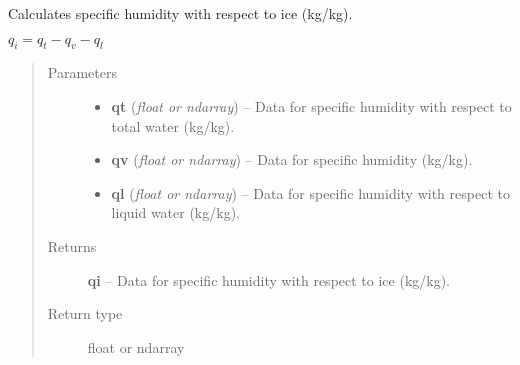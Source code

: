 \documentclass[letterpaper,10pt,english]{sphinxmanual}
\begin{document}
\begin{fulllineitems}
\label{atmos:atmos.equations.qi_from_qt_qv_ql}
Calculates specific humidity with respect to ice (kg/kg).

\(q_i = q_t-q_v-q_l\)
\begin{quote}\begin{description}
\item[{Parameters}] \leavevmode\begin{itemize}
\item {} 
\textbf{qt} (\emph{float or ndarray}) -- Data for specific humidity with respect to total water (kg/kg).

\item {} 
\textbf{qv} (\emph{float or ndarray}) -- Data for specific humidity (kg/kg).

\item {} 
\textbf{ql} (\emph{float or ndarray}) -- Data for specific humidity with respect to liquid water (kg/kg).

\end{itemize}

\item[{Returns}] \leavevmode
\textbf{qi} --
Data for specific humidity with respect to ice (kg/kg).

\item[{Return type}] \leavevmode
float or ndarray

\end{description}\end{quote}

\end{fulllineitems}

\end{document}
